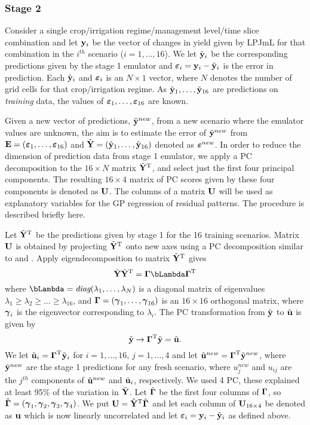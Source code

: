 \subsubsection{Stage 2}
Consider a single crop/irrigation regime/management level/time slice combination and let ${\bf y}_{i}$ be the vector of changes in yield given by LPJmL for that combination in the $i^{th}$ scenario ($i=1,\ldots,16$). We let ${\tilde {\bf y}}_{i}$ be the corresponding predictions given by the stage 1 emulator and ${\boldsymbol{\varepsilon}}_i = {\bf y}_{i} - {\tilde {\bf y}}_{i} $ is the error in prediction. Each ${\tilde {\bf y}}_{i}$ and ${\boldsymbol{\varepsilon}}_i$ is an $N\times 1$ vector, where $N$ denotes the number of grid cells for that crop/irrigation regime. As ${\tilde {\bf y}}_{1},\ldots, {\tilde {\bf y}}_{16}$ are predictions on {\em training} data, the values of ${\boldsymbol{\varepsilon}}_1,\ldots,{\boldsymbol{\varepsilon}}_{16}$ are known.

Given a new vector of predictions, ${\tilde {\bf y}}^{new}$, from a new scenario where the emulator values are unknown, the aim is to estimate the error of ${\tilde {\bf y}}^{new}$ from ${\bf E}=({\boldsymbol{\varepsilon}}_1,\ldots,{\boldsymbol{\varepsilon}}_{16})$ and ${\tilde {\bf Y}}=({\tilde {\bf y}}_1,\ldots, {\tilde {\bf y}}_{16})$ denoted as  ${\boldsymbol{\varepsilon}}^{new}$.
In order to reduce the dimension of prediction data from stage 1 emulator, we apply a PC decomposition to the $16\times N$ matrix ${\tilde {\bf Y}}^{\rm T}$, and select just the first four principal components. The resulting $16\times 4$ matrix of PC scores given by these four components is denoted as ${\bf U}$. The columns of a matrix ${\bf U}$ will be used as explanatory variables for the GP regression of residual patterns. The procedure is described briefly here.

Let ${\tilde {\bf Y}}^{\rm T}$ be the predictions given by stage 1 for the 16 training scenarios. Matrix $\bf U$ is obtained by projecting ${\tilde {\bf Y}}^{\rm T}$ onto new axes using a PC decomposition similar to \cite{q23} and \cite{60}. Apply eigendecomposition to matrix ${\tilde {\bf Y}}^{\rm T}$ gives
\begin{equation}
\tbY \tbY^{\rm T}= \bGamma \bLambda \bGamma ^{\rm T}
\end{equation}
where ${\bLambda} = \mbox{\em diag}(\lambda_1,\ldots,\lambda_{N})$ is a diagonal matrix of eigenvalues
$ \lambda_1 \ge \lambda_2 \ge \ldots \ge \lambda_{16}$, and ${\boldsymbol{\Gamma}}=({\boldsymbol{\gamma}}_1,\ldots,{\boldsymbol{\gamma}}_{16})$ is an $16\times 16$ orthogonal matrix, where ${{\boldsymbol{\gamma}}}_i$ is the eigenvector corresponding to $\lambda_i$. The PC transformation from ${\tilde {\bf y}}$ to ${\tilde {\bf u}}$ is given by
\begin{equation}%
\tby \rightarrow \bGamma ^{\rm T} \tby=\tbu.
\end{equation}
We let ${\tilde {\bf u}}_i={\boldsymbol{\Gamma}}^{\rm T} {\tilde {\bf y}}_i$ for $i=1, \ldots, 16$, $j=1, \ldots, 4$ and let ${\tilde {\bf u}}^{new}= {\boldsymbol{\Gamma}}^{\rm T} {\tilde {\bf y}}^{new}$, where ${\tilde {\bf y}}^{new}$ are the stage 1 predictions for any fresh scenario, where $u_j^{new}$ and $u_{ij}$ are the $j^{th}$ components of ${\tilde {\bf u}}^{new}$ and ${\tilde {\bf u}}_i$, respectively. We used 4 PC, these explained at least 95\% of the variation in ${\tilde {\bf Y}}$. Let ${\hat{\boldsymbol{\Gamma}}}$ be the first four columns of ${\boldsymbol{\Gamma}}$, so ${\hat{\boldsymbol{\Gamma}}}=({\boldsymbol{\gamma}}_1,{\boldsymbol{\gamma}}_2,{\boldsymbol{\gamma}}_3,{\boldsymbol{\gamma}}_4)$. We put ${\bf U}={\tilde {\bf Y}} ^{\rm T} {\hat{\boldsymbol{\Gamma}}}$ and let each column of ${\bf U}_{16\times 4}$ be denoted as ${\bf u}$ which is now linearly uncorrelated and let ${\boldsymbol{\varepsilon}}_i={\bf y}_i-{\tilde {\bf y}}_i$ as defined above.

